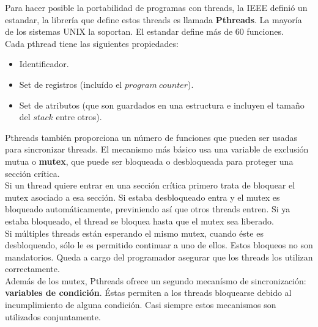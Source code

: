
Para hacer posible la portabilidad de programas con threads, la IEEE definió un estandar, la librería que define estos threads es llamada \textbf{Pthreads}.
La mayoría de los sistemas UNIX la soportan. El estandar define más de 60 funciones.\\
Cada pthread tiene las siguientes propiedades:
\begin{itemize}
 \item Identificador.
 \item Set de registros (incluído el $program\ counter$).
 \item Set de atributos (que son guardados en una estructura e incluyen el tamaño del $stack$ entre otros).\\
\end{itemize}

Pthreads también proporciona un número de funciones que pueden ser usadas para sincronizar threads. El mecanismo más básico usa una variable
de exclusión mutua o \textbf{mutex}, que puede ser bloqueada o desbloqueada para proteger una sección crítica.\\
Si un thread quiere entrar en una sección crítica primero trata de bloquear el mutex asociado a esa sección. Si estaba desbloqueado entra y 
el mutex es bloqueado automáticamente, previniendo así que otros threads entren. Si ya estaba bloqueado, el thread se bloquea hasta que el
mutex sea liberado.\\ 
Si múltiples threads están esperando el mismo mutex, cuando éste es desbloqueado, sólo le es permitido continuar a uno de ellos.
Estos bloqueos no son mandatorios. Queda a cargo del programador asegurar que los threads los utilizan correctamente.\\

Además de los mutex, Pthreads ofrece un segundo mecanísmo de sincronización: \textbf{variables de condición}. Éstas permiten a los threads 
bloquearse debido al incumplimiento de alguna condición. Casi siempre estos mecanismos son utilizados conjuntamente.

